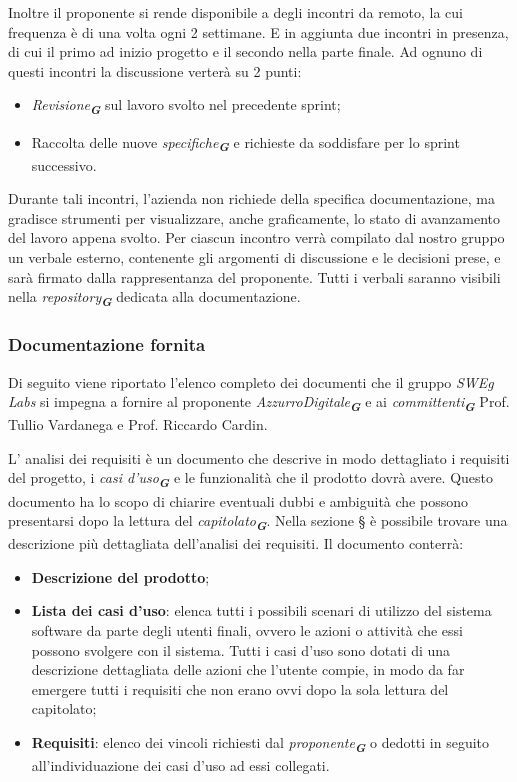 Inoltre il proponente si rende disponibile a degli incontri da remoto, la cui frequenza è di una volta ogni 2 settimane.
E in aggiunta due incontri in presenza, di cui il primo ad inizio progetto e il secondo nella parte finale.
Ad ognuno di questi incontri la discussione verterà su 2 punti:
\begin{itemize}
    \item \emph{Revisione}\textsubscript{\textit{\textbf{G}}} sul lavoro svolto nel precedente sprint;
    \item Raccolta delle nuove \emph{specifiche}\textsubscript{\textit{\textbf{G}}} e richieste da soddisfare per lo sprint successivo.
\end{itemize}
Durante tali incontri, l’azienda non richiede della specifica documentazione, ma gradisce strumenti per visualizzare, anche graficamente, lo stato di avanzamento del lavoro appena svolto.
Per ciascun incontro verrà compilato dal nostro gruppo un verbale esterno, contenente gli argomenti di discussione e le decisioni prese, e sarà firmato dalla rappresentanza del proponente.
Tutti i verbali saranno visibili nella \emph{repository}\textsubscript{\textit{\textbf{G}}} dedicata alla documentazione.

\subsubsection{Documentazione fornita}
\label{sec:documentazione_fornita}
Di seguito viene riportato l'elenco completo dei documenti che il gruppo \emph{SWEg Labs} si impegna a fornire al proponente \emph{AzzurroDigitale}\textsubscript{\textit{\textbf{G}}}
e ai \emph{committenti}\textsubscript{\textit{\textbf{G}}} Prof. Tullio Vardanega e Prof. Riccardo Cardin.

L' analisi dei requisiti è un documento che descrive in modo dettagliato i requisiti del progetto, i \emph{casi d'uso}\textsubscript{\textit{\textbf{G}}} e le funzionalità che il prodotto dovrà avere. 
Questo documento ha lo scopo di chiarire eventuali dubbi e ambiguità che possono presentarsi dopo la lettura del \emph{capitolato}\textsubscript{\textit{\textbf{G}}}.
Nella sezione \S{} è possibile trovare una descrizione più dettagliata dell'analisi dei requisiti.
Il documento conterrà:
\begin{itemize}
    \item \textbf{Descrizione del prodotto};
    \item \textbf{Lista dei casi d'uso}: elenca tutti i possibili scenari di utilizzo del sistema software
    da parte degli utenti finali, ovvero le azioni o attività che essi possono svolgere con il
    sistema. Tutti i casi d’uso sono dotati di una descrizione dettagliata delle azioni che
    l’utente compie, in modo da far emergere tutti i requisiti che non erano ovvi dopo la
    sola lettura del capitolato;
    \item \textbf{Requisiti}: elenco dei vincoli richiesti dal \emph{proponente}\textsubscript{\textit{\textbf{G}}} o dedotti in seguito all'individuazione dei casi d'uso ad essi collegati.
\end{itemize}

